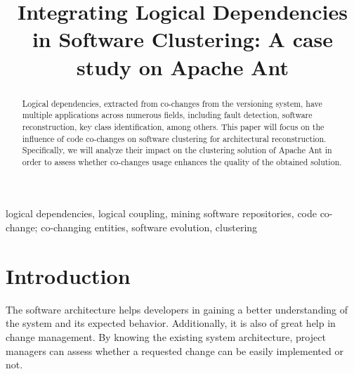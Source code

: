 \documentclass[conference]{IEEEtran}
\begin{document}
\title{Integrating Logical Dependencies in Software Clustering: A case study on Apache Ant}

\author{
\and
{}
}

\maketitle

\begin{abstract}
Logical dependencies, extracted from co-changes from the versioning system, have multiple applications across numerous fields, including fault detection, software reconstruction, key class identification, among others. This paper will focus on the influence of code co-changes on software clustering for architectural reconstruction. Specifically, we will analyze their impact on the clustering solution of Apache Ant in order to assess whether co-changes usage enhances the quality of the obtained solution.
\end{abstract}

\begin{IEEEkeywords}
logical dependencies, logical coupling, mining software repositories, code co-change; co-changing entities, software evolution, clustering
\end{IEEEkeywords}

\section{Introduction}

The software architecture helps developers in gaining a better understanding of the system and its expected behavior. Additionally, it is also of great help in change management. By knowing the existing system architecture, project managers can assess whether a requested change can be easily implemented or not.
\end{document}
